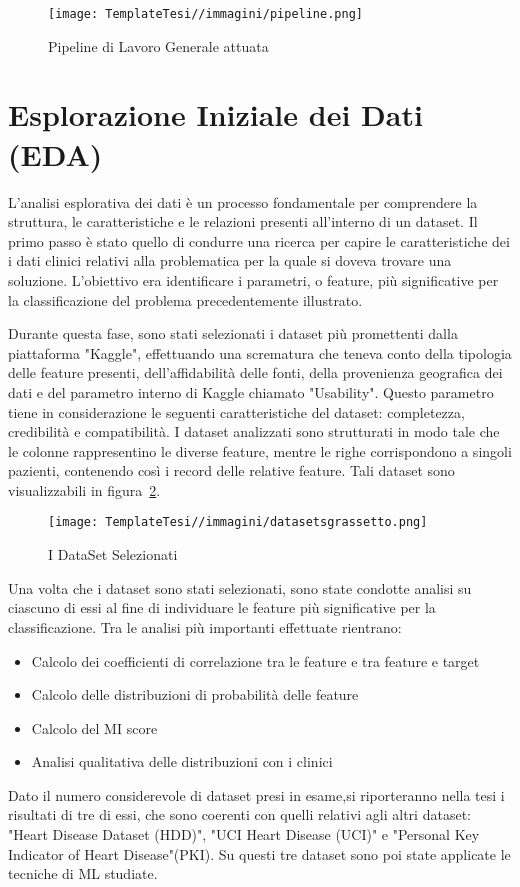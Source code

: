 \begin{flushleft}
\begin{figure}[H]
    \centering
    \texttt{[image: TemplateTesi//immagini/pipeline.png]}
    \caption{Pipeline di Lavoro Generale attuata}
    \label{fig:pipeline}
\end{figure}

\section{Esplorazione Iniziale dei Dati (EDA)}
L'analisi esplorativa dei dati è un processo fondamentale per comprendere la struttura, le caratteristiche e le relazioni presenti all'interno di un dataset. 
Il primo passo è stato quello di condurre una ricerca per capire le caratteristiche dei i dati clinici relativi alla problematica per la quale si doveva trovare una soluzione. L'obiettivo era identificare i parametri, o feature, più significative per la classificazione del problema precedentemente illustrato.

Durante questa fase, sono stati selezionati i dataset più promettenti dalla piattaforma "Kaggle", effettuando una scrematura che teneva conto della tipologia delle feature presenti, dell'affidabilità delle fonti, della provenienza geografica dei dati e del parametro interno di Kaggle chiamato "Usability". Questo parametro tiene in considerazione le seguenti caratteristiche del dataset: completezza, credibilità e compatibilità.
I dataset analizzati sono strutturati in modo tale che le colonne rappresentino le diverse feature, mentre le righe corrispondono a singoli pazienti, contenendo così i record delle relative feature.
Tali dataset sono visualizzabili in figura~\ref{fig:datasets}.

\begin{figure}[H]
    \centering
    \texttt{[image: TemplateTesi//immagini/datasetsgrassetto.png]}
    \caption{I DataSet Selezionati}
    \label{fig:datasets}
\end{figure}

Una volta che i dataset sono stati selezionati, sono state condotte analisi su ciascuno di essi al fine di individuare le feature più significative per la classificazione.
Tra le analisi più importanti effettuate rientrano:
\begin{itemize}
    \item Calcolo dei coefficienti di correlazione tra le feature e tra feature e target
    \item Calcolo delle distribuzioni di probabilità delle feature
    \item Calcolo del MI score 
    \item Analisi qualitativa delle distribuzioni con i clinici
\end{itemize}
Dato il numero considerevole di dataset presi in esame,si riporteranno nella tesi i risultati di tre di essi, che sono coerenti con quelli relativi agli altri dataset: "Heart Disease Dataset (HDD)", "UCI Heart Disease (UCI)" e "Personal Key Indicator of Heart Disease"(PKI).
Su questi tre dataset sono poi state applicate le tecniche di ML studiate.


\end{flushleft}
